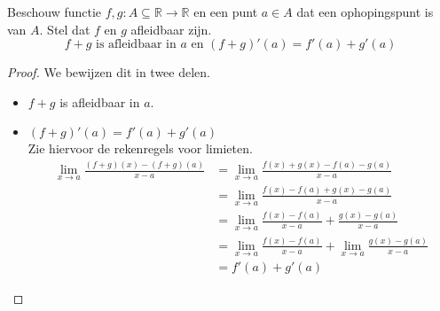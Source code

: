\documentclass[main.tex]{subfiles}
\begin{document}
\begin{pr}
  Beschouw functie $f,g: A \subseteq \mathbb{R} \rightarrow \mathbb{R}$ en een punt $a\in A$ dat een ophopingspunt is van $A$.
  Stel dat $f$ en $g$ afleidbaar zijn.
  \[ f+g \text{ is afleidbaar in } a \text{ en } (f+g)'(a) = f'(a) + g'(a) \]

  \begin{proof}
    We bewijzen dit in twee delen.
    \begin{itemize}
    \item $f+g$ is afleidbaar in $a$.
    \item $(f+g)'(a) = f'(a) + g'(a)$\\
      Zie hiervoor de rekenregels voor limieten.
      \[
      \begin{array}{rl}
        \lim_{x \rightarrow a}\frac{(f+g)(x)-(f+g)(a)}{x-a}
        &= \lim_{x \rightarrow a}\frac{f(x)+g(x)-f(a)-g(a)}{x-a}\\
        &= \lim_{x \rightarrow a}\frac{f(x)-f(a)+g(x)-g(a)}{x-a}\\
        &= \lim_{x \rightarrow a}\frac{f(x)-f(a)}{x-a}+\frac{g(x)-g(a)}{x-a}\\
        &= \lim_{x \rightarrow a}\frac{f(x)-f(a)}{x-a}+\lim_{x \rightarrow a}\frac{g(x)-g(a)}{x-a}\\
        &= f'(a) + g'(a)
      \end{array}
      \]
    \end{itemize}

  \end{proof}
\end{pr}
\end{document}
